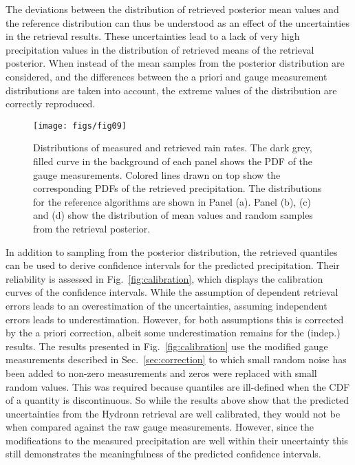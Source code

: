 \documentclass[journal abbreviation, manuscript]{copernicus}
\begin{document}
 The deviations between the distribution of retrieved posterior mean values and
 the reference distribution can thus be understood as an effect of the
 uncertainties in the retrieval results. These uncertainties lead to a lack of
 very high precipitation values in the distribution of retrieved means of the
 retrieval posterior. When instead of the mean samples from the posterior
 distribution are considered, and the differences between the a priori and gauge
 measurement distributions are taken into account, the extreme values of the
 distribution are correctly reproduced.

\begin{figure}
  \centering
  \texttt{[image: figs/fig09]}
  \caption{
    Distributions of measured and retrieved rain rates. The dark grey, filled
    curve in the background of each panel shows the PDF of the gauge
    measurements. Colored lines drawn on top show the corresponding PDFs of the
    retrieved precipitation. The distributions for the reference algorithms are
    shown in Panel (a). Panel (b), (c) and (d) show the distribution of mean
    values and random samples from the retrieval posterior.
  }
  \label{fig:rain_rate_distributions}
\end{figure}

In addition to sampling from the posterior distribution, the retrieved quantiles
can be used to derive confidence intervals for the predicted precipitation.
Their reliability is assessed in Fig.~\ref{fig:calibration}, which displays the
calibration curves of the confidence intervals. While the assumption of
dependent retrieval errors leads to an overestimation of the uncertainties,
assuming independent errors leads to underestimation. However, for both
assumptions this is corrected by the a priori correction, albeit some
underestimation remains for the (indep.) results. The results presented in
Fig.~\ref{fig:calibration} use the modified gauge measurements described in
Sec.~\ref{sec:correction} to which small random noise has been added to non-zero
measurements and zeros were replaced with small random values. This was required
because quantiles are ill-defined when the CDF of a quantity is discontinuous.
So while the results above show that the predicted uncertainties from the
Hydronn retrieval are well calibrated, they would not be when compared against
the raw gauge measurements. However, since the modifications to the measured
precipitation are well within their uncertainty this  still demonstrates
the meaningfulness of the predicted confidence intervals.
\end{document}
